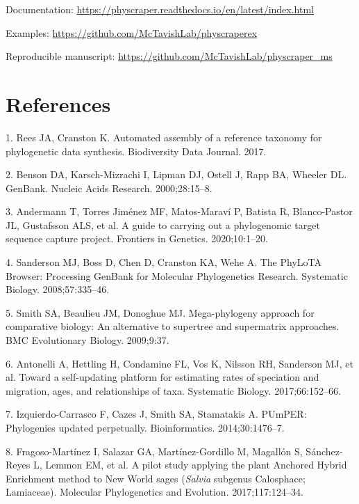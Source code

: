 \documentclass[]{article}
\begin{document}
Documentation: \url{https://physcraper.readthedocs.io/en/latest/index.html}

Examples: \url{https://github.com/McTavishLab/physcraperex}

Reproducible manuscript: \url{https://github.com/McTavishLab/physcraper_ms}

\hypertarget{references}{%
\section*{References}\label{references}}

\hypertarget{refs}{}
\leavevmode\hypertarget{ref-rees2017automated}{}%
1. Rees JA, Cranston K. Automated assembly of a reference taxonomy for phylogenetic data synthesis. Biodiversity Data Journal. 2017.

\leavevmode\hypertarget{ref-benson2000genbank}{}%
2. Benson DA, Karsch-Mizrachi I, Lipman DJ, Ostell J, Rapp BA, Wheeler DL. GenBank. Nucleic Acids Research. 2000;28:15--8.

\leavevmode\hypertarget{ref-andermann2020guide}{}%
3. Andermann T, Torres Jiménez MF, Matos-Maraví P, Batista R, Blanco-Pastor JL, Gustafsson ALS, et al. A guide to carrying out a phylogenomic target sequence capture project. Frontiers in Genetics. 2020;10:1--20.

\leavevmode\hypertarget{ref-sanderson2008phylota}{}%
4. Sanderson MJ, Boss D, Chen D, Cranston KA, Wehe A. The PhyLoTA Browser: Processing GenBank for Molecular Phylogenetics Research. Systematic Biology. 2008;57:335--46.

\leavevmode\hypertarget{ref-smith2009mega}{}%
5. Smith SA, Beaulieu JM, Donoghue MJ. Mega-phylogeny approach for comparative biology: An alternative to supertree and supermatrix approaches. BMC Evolutionary Biology. 2009;9:37.

\leavevmode\hypertarget{ref-antonelli2017toward}{}%
6. Antonelli A, Hettling H, Condamine FL, Vos K, Nilsson RH, Sanderson MJ, et al. Toward a self-updating platform for estimating rates of speciation and migration, ages, and relationships of taxa. Systematic Biology. 2017;66:152--66.

\leavevmode\hypertarget{ref-izquierdo2014pumper}{}%
7. Izquierdo-Carrasco F, Cazes J, Smith SA, Stamatakis A. PUmPER: Phylogenies updated perpetually. Bioinformatics. 2014;30:1476--7.

\leavevmode\hypertarget{ref-fragoso2017pilot}{}%
8. Fragoso-Martínez I, Salazar GA, Martínez-Gordillo M, Magallón S, Sánchez-Reyes L, Lemmon EM, et al. A pilot study applying the plant Anchored Hybrid Enrichment method to New World sages (\emph{Salvia} subgenus Calosphace; Lamiaceae). Molecular Phylogenetics and Evolution. 2017;117:124--34.
\end{document}
